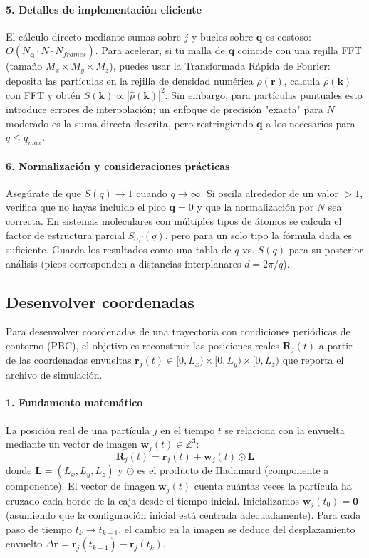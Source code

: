 \documentclass{tufte-handout}
\begin{document}
\paragraph{5. Detalles de implementación eficiente}
El cálculo directo mediante sumas sobre $j$ y bucles sobre $\mathbf{q}$ es costoso: $O(N_{\mathbf{q}} \cdot N \cdot N_{frames})$.  
Para acelerar, si tu malla de $\mathbf{q}$ coincide con una rejilla FFT (tamaño $M_x \times M_y \times M_z$), puedes usar la Transformada Rápida de Fourier: deposita las partículas en la rejilla de densidad numérica $\rho(\mathbf{r})$, calcula $\hat{\rho}(\mathbf{k})$ con FFT y obtén $S(\mathbf{k}) \propto |\hat{\rho}(\mathbf{k})|^2$.  
Sin embargo, para partículas puntuales esto introduce errores de interpolación; un enfoque de precisión "exacta" para $N$ moderado es la suma directa descrita, pero restringiendo $\mathbf{q}$ a los necesarios para $q \leq q_{max}$.

\paragraph{6. Normalización y consideraciones prácticas}
Asegúrate de que $S(q) \to 1$ cuando $q \to \infty$. Si oscila alrededor de un valor $>1$, verifica que no hayas incluido el pico $\mathbf{q}=0$ y que la normalización por $N$ sea correcta.  
En sistemas moleculares con múltiples tipos de átomos se calcula el factor de estructura parcial $S_{\alpha\beta}(q)$, pero para un solo tipo la fórmula dada es suficiente.  
Guarda los resultados como una tabla de $q$ vs. $S(q)$ para su posterior análisis (picos corresponden a distancias interplanares $d = 2\pi/q$).

\newpage

\subsection{Desenvolver coordenadas}

Para desenvolver coordenadas de una trayectoria con condiciones periódicas de contorno (PBC), el objetivo es reconstruir las posiciones reales $\mathbf{R}_j(t)$ a partir de las coordenadas envueltas $\mathbf{r}_j(t) \in [0, L_x) \times [0, L_y) \times [0, L_z)$ que reporta el archivo de simulación.

\paragraph{1. Fundamento matemático}
La posición real de una partícula $j$ en el tiempo $t$ se relaciona con la envuelta mediante un vector de imagen $\mathbf{w}_j(t) \in \mathbb{Z}^3$:
$$ \mathbf{R}_j(t) = \mathbf{r}_j(t) + \mathbf{w}_j(t) \odot \mathbf{L} $$
donde $\mathbf{L} = (L_x, L_y, L_z)$ y $\odot$ es el producto de Hadamard (componente a componente).  
El vector de imagen $\mathbf{w}_j(t)$ cuenta cuántas veces la partícula ha cruzado cada borde de la caja desde el tiempo inicial.  
Inicializamos $\mathbf{w}_j(t_0) = \mathbf{0}$ (asumiendo que la configuración inicial está centrada adecuadamente).  
Para cada paso de tiempo $t_k \to t_{k+1}$, el cambio en la imagen se deduce del desplazamiento envuelto $\Delta \mathbf{r} = \mathbf{r}_j(t_{k+1}) - \mathbf{r}_j(t_k)$.
\end{document}
